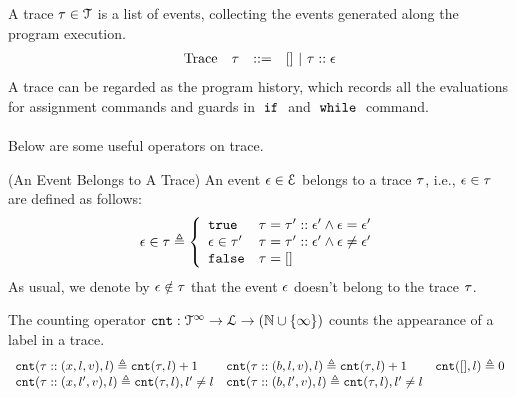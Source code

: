 %
A trace $\mathtt{\tau} \in \mathcal{T} $ is a list of events, 
collecting the events generated along the program execution. 
\[
\begin{array}{llll}
\mbox{Trace} & \mathtt{\tau}
& ::= & [] ~|~ \mathtt{\tau} :: \mathtt{\epsilon}
\end{array}
\]
A trace can be regarded as the program history, 
which records all the evaluations for assignment commands and guards in $\;\mathtt{if}\;$ and $\;\mathtt{while}\;$ command.
\\
\\
Below are some useful operators on trace.
\begin{defn}(An Event Belongs to A Trace)
  An event $\mathtt{\epsilon} \in \mathcal{E}$ belongs to a trace $\mathtt{\tau}$, i.e., $\mathtt{\epsilon} \in \mathtt{\tau}$ are defined as follows:
%
\begin{equation*}
  \event \in \trace  
  \triangleq \left\{
  \begin{array}{ll} 
    \etrue                  & \trace =  \trace' :: \event'
     \land \event = \event'
                              \\
    \event \in \trace' & \trace =  \trace' :: \event'
    \land \event \neq \event' \\ 
    \efalse                 & \trace = []
  \end{array}
  \right.
\end{equation*}
As usual, we denote by $\mathtt{\epsilon} \notin \mathtt{\tau}$ that the event $\mathtt{\epsilon}$ doesn't belong to the trace $\mathtt{\tau}$.
\end{defn}
%
The counting operator $\mathtt{cnt} : \mathcal{T}^{\infty} \to \mathcal{L} \to (\mathbb{N} \cup \{\infty\})$
counts the appearance of a label in a trace.
\[
\begin{array}{lll}
\mathtt{cnt}(\mathtt{\tau} :: (x, l, v), l ) \triangleq \mathtt{cnt}(\mathtt{\tau}, l) + 1
&
\mathtt{cnt}(\mathtt{\tau}  ::(b, l, v), l) \triangleq \mathtt{cnt}(\mathtt{\tau}, l) + 1
&
\mathtt{cnt}({[]}, l) \triangleq 0
\\
\mathtt{cnt}(\mathtt{\tau}  :: (x, l', v), l) \triangleq \mathtt{cnt}(\mathtt{\tau}, l), l' \neq l
&
\mathtt{cnt}(\mathtt{\tau}  :: (b, l', v), l) \triangleq \mathtt{cnt}(\mathtt{\tau}, l), l' \neq l
\end{array}
\]
